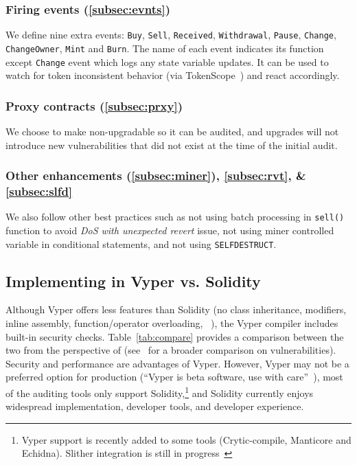 \subsubsection{Firing events (\ref{subsec:evnts})}
We define nine extra events: \texttt{Buy}, \texttt{Sell}, \texttt{Received}, \texttt{Withdrawal}, \texttt{Pause}, \texttt{Change}, \texttt{ChangeOwner}, \texttt{Mint} and \texttt{Burn}. The name of each event indicates its function except \texttt{Change} event which logs any state variable updates. It can be used to watch for token inconsistent behavior (\eg via TokenScope~\cite{TokenScope}) and react accordingly. 
	
\subsubsection{Proxy contracts (\ref{subsec:prxy})}
We choose to make \sys non-upgradable so it can be audited, and upgrades will not introduce new vulnerabilities that did not exist at the time of the initial audit. 
	
\subsubsection{Other enhancements (\ref{subsec:miner}), \ref{subsec:rvt}, \& \ref{subsec:slfd}}
We also follow other best practices such as not using batch processing in \texttt{sell()} function to avoid \textit{DoS with unexpected revert} issue, not using miner controlled variable in conditional statements, and not using \texttt{SELFDESTRUCT}.

\subsection{Implementing in Vyper vs. Solidity}
Although Vyper offers less features than Solidity (\eg no class inheritance, modifiers, inline assembly, function/operator overloading, \etc~\cite{SolidityDoc}), the Vyper compiler includes built-in security checks. Table~\ref{tab:compare} provides a comparison between the two from the perspective of \sys (see~\cite{Vyper1} for a broader comparison on vulnerabilities). Security and performance are advantages of Vyper. However, Vyper may not be a preferred option for production (``Vyper is beta software, use with care''~\cite{VyperReadme}), most of the auditing tools only support Solidity,\footnote{Vyper support is recently added to some tools (\eg Crytic-compile, Manticore and Echidna). Slither integration is still in progress~\cite{Crytic}} and Solidity currently enjoys widespread  implementation, developer tools, and developer experience.

